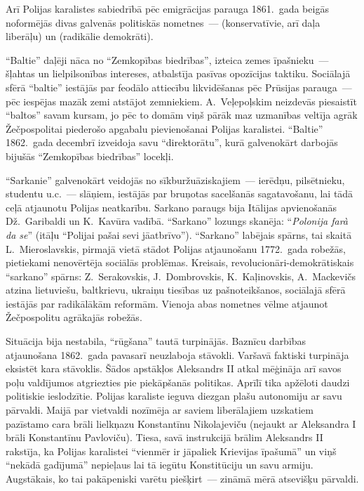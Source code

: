 \documentclass[twoside,a5paper,12pt,fleqn,openany]{extbook}
\newcommand{\ittxti}[1]{\textit{\textitalian{#1}}}
\begin{document}
Arī Polijas karalistes sabiedrībā pēc emigrācijas parauga 1861.~gada beigās noformējās divas galvenās politiskās nometnes~---  (konservatīvie, arī daļa liberāļu) un  (radikālie demokrāti).

``Baltie'' daļēji nāca no ``Zemkopības biedrības'', izteica zemes īpašnieku~--- šļahtas un lielpilsonības intereses, atbalstīja pasīvas opozīcijas taktiku. Sociālajā sfērā ``baltie'' iestājās par feodālo attiecību likvidēšanas pēc Prūsijas parauga~--- pēc iespējas mazāk zemi atstājot zemniekiem. A.~Veļepoļskim neizdevās piesaistīt ``baltos'' savam kursam, jo pēc to domām viņš pārāk maz uzmanības veltīja agrāk Žečpospolitai piederošo apgabalu pievienošanai Polijas karalistei. ``Baltie'' 1862.~gada decembrī izveidoja savu ``direktorātu'', kurā galvenokārt darbojās bijušās ``Zemkopības biedrības'' locekļi.

``Sarkanie'' galvenokārt veidojās no sīkburžuāziskajiem~--- ierēdņu, pilsētnieku, studentu u.c.~--- slāņiem, iestājās par bruņotas sacelšanās sagatavošanu, lai tādā ceļā atjaunotu Polijas neatkarību. Sarkano paraugs bija Itālijas apvienošanās Dž.~Garibaldi un K.~Kavūra vadībā. ``Sarkano'' lozungs skanēja: ``\ittxti{Polonija farà da se}'' (itāļu ``Polijai pašai sevi jāatbrīvo''). ``Sarkano'' labējais spārns, tai skaitā L.~Mieroslavskis, pirmajā vietā stādot Polijas atjaunošanu 1772.~gada robežās, pietiekami nenovērtēja sociālās problēmas. Kreisais, revolucionāri-demokrātiskais ``sarkano'' spārns: Z.~Serakovskis, J.~Dombrovskis, K.~Kaļinovskis, A.~Mackevičs atzina lietuviešu, baltkrievu, ukraiņu tiesības uz pašnoteikšanos, sociālajā sfērā iestājās par radikālākām reformām. Vienoja abas nometnes vēlme atjaunot Žečpospolitu agrākajās robežās.

Situācija bija nestabila, ``rūgšana'' tautā turpinājās. Baznīcu darbības atjaunošana 1862.~gada pavasarī neuzlaboja stāvokli. Varšavā faktiski turpināja eksistēt kara stāvoklis. Šādos apstākļos Aleksandrs II atkal mēģināja arī savos poļu valdījumos atgriezties pie piekāpšanās politikas. Aprīlī tika apžēloti daudzi politiskie ieslodzītie. Polijas karaliste ieguva diezgan plašu autonomiju ar savu pārvaldi. Maijā par vietvaldi nozīmēja ar saviem liberālajiem uzskatiem pazīstamo cara brāli lielkņazu Konstantīnu Nikolajeviču (nejaukt ar Aleksandra I brāli Konstantīnu Pavloviču). Tiesa, savā instrukcijā brālim Aleksandrs II rakstīja, ka Polijas karalistei ``vienmēr ir jāpaliek Krievijas īpašumā'' un viņš ``nekādā gadījumā'' nepieļaus lai tā iegūtu Konstitūciju un savu armiju. Augstākais, ko tai pakāpeniski varētu piešķirt~--- zināmā mērā atsevišķu pārvaldi.
\end{document}
